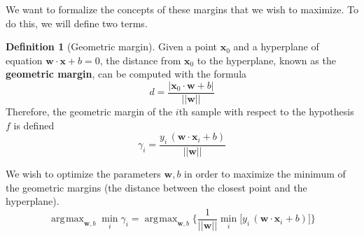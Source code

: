 \documentclass{article}
\DeclareMathOperator*{\argmax}{\arg\!\max}
\theoremstyle{definition}
\theoremstyle{remark}
\theoremstyle{definition}
\newtheorem{definition}{Definition}[section]
\begin{document}
We want to formalize the concepts of these margins that we wish to maximize. To do this, we will define two terms. 

\begin{definition}[Geometric margin]
    Given a point $\mathbf{x}_0$ and a hyperplane of equation $\mathbf{w} \cdot \mathbf{x} + b = 0$, the distance from $\mathbf{x}_0$ to the hyperplane, known as the \textbf{geometric margin}, can be computed with the formula 
    \begin{equation*}
        d = \frac{|\mathbf{x}_0 \cdot \mathbf{w} + b|}{||\mathbf{w}||}  
    \end{equation*} 
    Therefore, the geometric margin of the $i$th sample with respect to the hypothesis $f$ is defined 
    \begin{equation*}
        \gamma_i = \frac{y_i \, (\mathbf{w} \cdot \mathbf{x}_i + b)}{||\mathbf{w}||} 
    \end{equation*} 
\end{definition}

We wish to optimize the parameters $\mathbf{w}, b$ in order to maximize the minimum of the geometric margins (the distance between the closest point and the hyperplane). 
\begin{equation*}
  \argmax_{\mathbf{w}, b} \min_i \gamma_i = \argmax_{\mathbf{w}, b} \bigg\{ \frac{1}{||\mathbf{w}||} \min_i \big[y_i \, (\mathbf{w} \cdot \mathbf{x}_i + b) \big] \bigg\}
\end{equation*}
\end{document}
